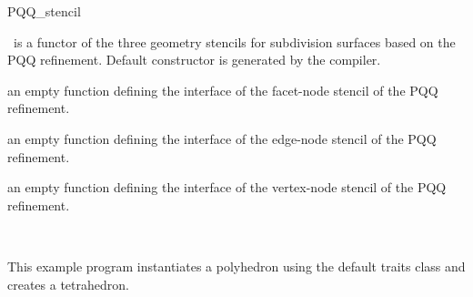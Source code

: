 \begin{ccRefClass}{PQQ_stencil}







\ccCreation

\ccClassTemplateName\ is a functor of the three geometry stencils for
subdivision surfaces based on the PQQ refinement. Default constructor 
is generated by the compiler.


\ccThree{}{}{}

{an empty function defining the interface of the facet-node stencil 
of the PQQ refinement.}

{an empty function defining the interface of the edge-node stencil 
of the PQQ refinement.}

{an empty function defining the interface of the vertex-node stencil
of the PQQ refinement.}



\ccSeeAlso

\\

\ccExample

This example program instantiates a polyhedron using the default
traits class and creates a tetrahedron.


\end{ccRefClass}

